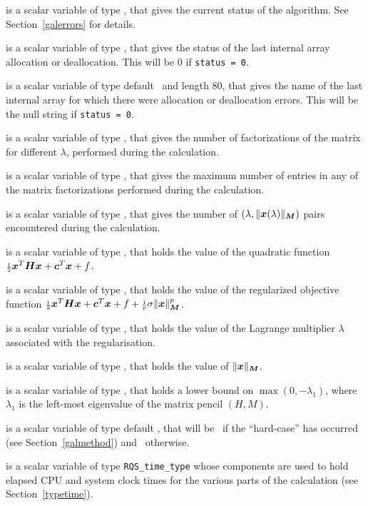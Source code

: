 \documentclass{galahad}
\newcommand{\packagename}{RQS}
\begin{document}
\begin{description}
 is a scalar variable of type \integer, that gives the
current status of the algorithm. See Section~\ref{galerrors} for details.

 is a scalar variable of type \integer,
that gives the status of the last internal array allocation
or deallocation. This will be 0 if {\tt status = 0}.

 is a scalar variable of type default \character\
and length 80, that  gives the name of the last internal array
for which there were allocation or deallocation errors.
This will be the null string if {\tt status = 0}.

 is a scalar variable of type \integer, that
gives the number of factorizations of the matrix \req{kkt}
for different $\lambda$, performed during the calculation.

 is a scalar variable of type \integer, that
gives the maximum number of entries in any of the matrix factorizations
performed during the calculation.

 is a scalar variable of type \integer, that gives
the number of $(\lambda,\|{\bm{x}}(\lambda)\|_{{\bm{M}}})$ pairs encountered during the
calculation.

 is a scalar variable of type \realdp, that holds the
value of the quadratic function ${\scriptstyle \frac{1}{2}} {\bm{x}}^T {\bm{H}} {\bm{x}}  +  {\bm{c}}^T {\bm{x}} + f$.

 is a scalar variable of type \realdp, that
holds the value of the regularized objective function ${\scriptstyle \frac{1}{2}} {\bm{x}}^T {\bm{H}} {\bm{x}}
 + {\bm{c}}^T {\bm{x}} + f + {\scriptstyle \frac{1}{p}} \sigma \|{\bm{x}}\|_{{\bm{M}}}^p$.

 is a scalar variable of type \realdp, that holds the
value of the Lagrange multiplier $\lambda$ associated with the regularisation.

 is a scalar variable of type \realdp,
that holds the value of $\|{\bm{x}}\|_{{\bm{M}}}$.

 is a scalar variable of type \realdp, that holds a lower
bound on $\max(0,-\lambda_1)$, where $\lambda_1$ is the left-most eigenvalue of
the matrix pencil $(H,M)$.

 is a scalar variable of type default \logical, that will be
\true\ if the ``hard-case'' has occurred (see Section~\ref{galmethod})
and \false\ otherwise.

 is a scalar variable of type {\tt \packagename\_time\_type}
whose components are used to hold elapsed CPU  and system clock times for the
various parts of the calculation (see Section~\ref{typetime}).


\end{description}
\end{document}
